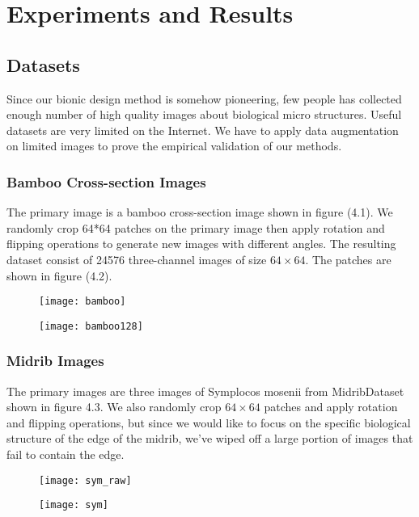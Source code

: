 \chapter{Experiments and Results}

\section{Datasets}
Since our bionic design method is somehow pioneering, few people has collected enough number of high quality images about biological micro structures. Useful datasets are very limited on the Internet. We have to apply data augmentation on limited images to prove the empirical validation of our methods.

\subsection{Bamboo Cross-section Images}
The primary image is a bamboo cross-section image shown in figure (4.1). We randomly crop 64*64 patches on the primary image then apply rotation and flipping operations to generate new images with different angles. The resulting dataset consist of 24576 three-channel images of size $64\times64$. The patches are shown in figure (4.2).
\begin{figure}
	\centering
	\texttt{[image: bamboo]}
	\label{fig:10}
\end{figure}
\begin{figure}
	\centering
	\texttt{[image: bamboo128]}
	\label{fig:11}
\end{figure}
\subsection{Midrib Images}
The primary images are three images of Symplocos mosenii from MidribDataset shown in figure 4.3. We also randomly crop $64\times64$ patches and apply rotation and flipping operations, but since we would like to focus on the specific biological structure of the edge of the midrib, we've wiped off a large portion of images that fail to contain the edge. 
\begin{figure}
	\centering
	\texttt{[image: sym\_raw]}
	\label{fig:12}
\end{figure}
\begin{figure}
	\centering
	\texttt{[image: sym]}
	\label{fig:12}
\end{figure}

